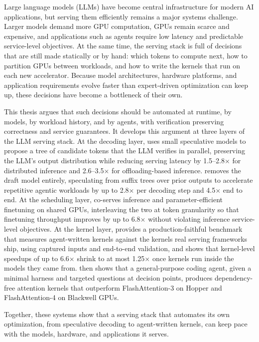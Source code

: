 Large language models (LLMs) have become central infrastructure for modern AI applications, but serving them efficiently remains a major systems challenge. Larger models demand more GPU computation, GPUs remain scarce and expensive, and applications such as agents require low latency and predictable service-level objectives. At the same time, the serving stack is full of decisions that are still made statically or by hand: which tokens to compute next, how to partition GPUs between workloads, and how to write the kernels that run on each new accelerator. Because model architectures, hardware platforms, and application requirements evolve faster than expert-driven optimization can keep up, these decisions have become a bottleneck of their own.

This thesis argues that such decisions should be automated at runtime, by models, by workload history, and by agents, with verification preserving correctness and service guarantees. It develops this argument at three layers of the LLM serving stack. At the decoding layer, \SpecInfer uses small speculative models to propose a tree of candidate tokens that the LLM verifies in parallel, preserving the LLM's output distribution while reducing serving latency by 1.5--2.8$\times$ for distributed inference and 2.6--3.5$\times$ for offloading-based inference. \SuffixDecoding removes the draft model entirely, speculating from suffix trees over prior outputs to accelerate repetitive agentic workloads by up to 2.8$\times$ per decoding step and 4.5$\times$ end to end. At the scheduling layer, \FlexLLM co-serves inference and parameter-efficient finetuning on shared GPUs, interleaving the two at token granularity so that finetuning throughput improves by up to 6.8$\times$ without violating inference service-level objectives. At the kernel layer, \FastKernels provides a production-faithful benchmark that measures agent-written kernels against the kernels real serving frameworks ship, using captured inputs and end-to-end validation, and shows that kernel-level speedups of up to 6.6$\times$ shrink to at most 1.25$\times$ once kernels run inside the models they came from. \KernelSeek then shows that a general-purpose coding agent, given a minimal harness and targeted questions at decision points, produces dependency-free attention kernels that outperform FlashAttention-3 on Hopper and FlashAttention-4 on Blackwell GPUs.

Together, these systems show that a serving stack that automates its own optimization, from speculative decoding to agent-written kernels, can keep pace with the models, hardware, and applications it serves.
